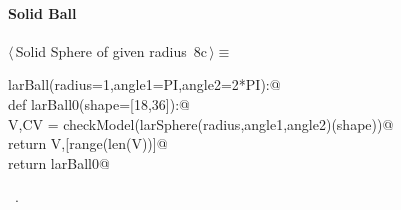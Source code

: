\documentclass[11pt,oneside]{article}	%
\begin{document}
\paragraph{Solid Ball}
\begin{flushleft} \small \label{scrap16}
\protect{}$\langle\,$Solid Sphere of given radius\nobreak\ {\footnotesize 8c}$\,\rangle\equiv$
\vspace{-1ex}
\begin{list}{}{} \item
\mbox{}\verb@def larBall(radius=1,angle1=PI,angle2=2*PI):@\\
\mbox{}\verb@   def larBall0(shape=[18,36]):@\\
\mbox{}\verb@      V,CV = checkModel(larSphere(radius,angle1,angle2)(shape))@\\
\mbox{}\verb@      return V,[range(len(V))]@\\
\mbox{}\verb@   return larBall0@\\
\mbox{}\verb@@{\NWsep}
\end{list}
\vspace{-1ex}
\footnotesize\addtolength{\baselineskip}{-1ex}
\begin{list}{}{\setlength{\itemsep}{-\parsep}\setlength{\itemindent}{-\leftmargin}}
\item \NWtxtMacroRefIn\ .
\end{list}
\end{flushleft}
\end{document}
